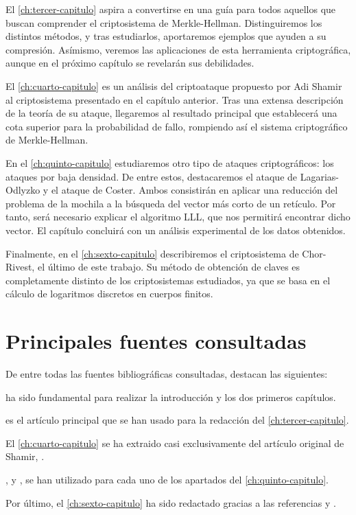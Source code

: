El \autoref{ch:tercer-capitulo} aspira a convertirse en una guía para todos aquellos que buscan comprender el criptosistema de Merkle-Hellman. Distinguiremos los distintos métodos, y tras estudiarlos, aportaremos ejemplos que ayuden a su compresión. Asímismo, veremos las aplicaciones de esta herramienta criptográfica, aunque en el próximo capítulo se revelarán sus debilidades.

El \autoref{ch:cuarto-capitulo} es un análisis del criptoataque propuesto por Adi Shamir al criptosistema presentado en el capítulo anterior. Tras una extensa descripción de la teoría de su ataque, llegaremos al resultado principal que establecerá una cota superior para la probabilidad de fallo, rompiendo así el sistema criptográfico de Merkle-Hellman.

En el \autoref{ch:quinto-capitulo} estudiaremos otro tipo de ataques criptográficos: los ataques por baja densidad. De entre estos, destacaremos el ataque de Lagarias-Odlyzko y el ataque de Coster. Ambos consistirán en aplicar una reducción del problema de la mochila a la búsqueda del vector más corto de un retículo. Por tanto, será necesario explicar el algoritmo LLL, que nos permitirá encontrar dicho vector. El capítulo concluirá con un análisis experimental de los datos obtenidos.

Finalmente, en el \autoref{ch:sexto-capitulo} describiremos el criptosistema de Chor-Rivest, el último de este trabajo. Su método de obtención de claves es completamente distinto de los criptosistemas estudiados, ya que se basa en el cálculo de logaritmos discretos en cuerpos finitos. 

\section*{Principales fuentes consultadas}

De entre todas las fuentes bibliográficas consultadas, destacan las siguientes:

\cite{cryptoSchool} ha sido fundamental para realizar la introducción y los dos primeros capítulos.

\cite{artMH} es el artículo principal que se han usado para la redacción del \autoref{ch:tercer-capitulo}.

El \autoref{ch:cuarto-capitulo} se ha extraido casi exclusivamente del artículo original de Shamir, \cite{artSha}.

\cite{artLLL}, \cite{artLagOdl} y \cite{artCoster}, se han utilizado para cada uno de los apartados del \autoref{ch:quinto-capitulo}.

Por último, el \autoref{ch:sexto-capitulo} ha sido redactado gracias a las referencias \cite{artChorRivest} y \cite{artQuanChorRivest}.

\endinput
